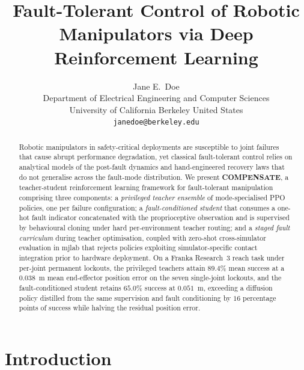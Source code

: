 \documentclass{article}
\title{Fault-Tolerant Control of Robotic Manipulators via Deep Reinforcement Learning}
\author{
  Jane E.~Doe\\
  Department of Electrical Engineering and Computer Sciences\\
  University of California Berkeley 
  United States\\
  \texttt{janedoe@berkeley.edu} \\
}
\begin{document}
\maketitle


\begin{abstract}
	Robotic manipulators in safety-critical deployments are susceptible to joint failures that
	cause abrupt performance degradation, yet classical fault-tolerant control relies on analytical
	models of the post-fault dynamics and hand-engineered recovery laws that do not generalise
	across the fault-mode distribution. We present \textbf{COMPENSATE}, a teacher-student
	reinforcement learning framework for fault-tolerant manipulation comprising three components:
	a \emph{privileged teacher ensemble} of mode-specialised PPO policies, one per failure
	configuration; a \emph{fault-conditioned student} that consumes a one-hot fault indicator
	concatenated with the proprioceptive observation and is supervised by behavioural cloning under
	hard per-environment teacher routing; and a \emph{staged fault curriculum} during teacher
	optimisation, coupled with zero-shot cross-simulator evaluation in mjlab that rejects policies
	exploiting simulator-specific contact integration prior to hardware deployment. On a Franka
	Research~3 reach task under per-joint permanent lockouts, the privileged teachers attain
	$89.4\%$ mean success at a $0.038$~m mean end-effector position error on the seven
	single-joint lockouts, and the fault-conditioned
	student retains $65.0\%$ success at $0.051$~m, exceeding a diffusion policy distilled from the
	same supervision and fault conditioning by $16$ percentage points of success while halving the
	residual position error. 
\end{abstract}



\section{Introduction}
\end{document}
